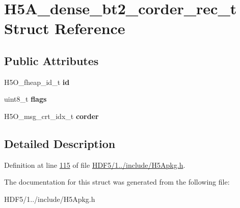\hypertarget{struct_h5_a__dense__bt2__corder__rec__t}{}\section{H5\+A\+\_\+dense\+\_\+bt2\+\_\+corder\+\_\+rec\+\_\+t Struct Reference}
\label{struct_h5_a__dense__bt2__corder__rec__t}
\subsection*{Public Attributes}
\begin{DoxyCompactItemize}
\item 
\mbox{\label{struct_h5_a__dense__bt2__corder__rec__t_a56f3b7c5ca5550a0a4897461a74be446}} 
H5\+O\+\_\+fheap\+\_\+id\+\_\+t {\bfseries id}
\item 
\mbox{\label{struct_h5_a__dense__bt2__corder__rec__t_ac6f5afc2f1968c77c97efb7fb41c468c}} 
uint8\+\_\+t {\bfseries flags}
\item 
\mbox{\label{struct_h5_a__dense__bt2__corder__rec__t_a91ed669c60d49809962074ba5cf7cee7}} 
H5\+O\+\_\+msg\+\_\+crt\+\_\+idx\+\_\+t {\bfseries corder}
\end{DoxyCompactItemize}


\subsection{Detailed Description}


Definition at line \hyperlink{_h_d_f5_21_810_81_2include_2_h5_apkg_8h_source_l00115}{115} of file \hyperlink{_h_d_f5_21_810_81_2include_2_h5_apkg_8h_source}{H\+D\+F5/1../include/\+H5\+Apkg.\+h}.



The documentation for this struct was generated from the following file\+:\begin{DoxyCompactItemize}
\item 
H\+D\+F5/1../include/\+H5\+Apkg.\+h\end{DoxyCompactItemize}
